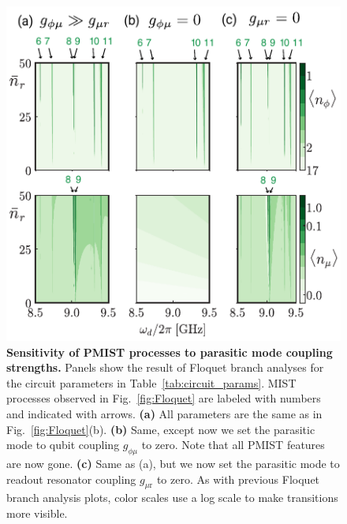 \documentclass[%
reprint,
superscriptaddress,
 amsmath,amssymb,
 aps,
 prx,
longbibliography,
floatfix,
]{revtex4-2}
\begin{document}
\begin{figure}[t]
    \centering
    \includegraphics[width=\linewidth]{Figures/Floquet_coupling.pdf}
    \caption{
        {\bf Sensitivity of PMIST processes to parasitic mode coupling strengths.} Panels show the result of Floquet branch analyses for the circuit parameters in Table~\ref{tab:circuit_params}. MIST processes observed in Fig.~\ref{fig:Floquet} are labeled with numbers and indicated with arrows. \textbf{(a)} All parameters are the same as in Fig.~\ref{fig:Floquet}(b). \textbf{(b)} Same, except now we set the parasitic mode to qubit coupling $g_{\phi \mu}$ to zero. Note that all PMIST features are now gone. \textbf{(c)} Same as (a), but we now set the parasitic mode to readout resonator coupling $g_{\mu \textrm{r}}$ to zero. As with previous Floquet branch analysis plots, color scales use a log scale to make transitions more visible.}
    \label{fig:coupling-Floquet}
\end{figure}
\end{document}
